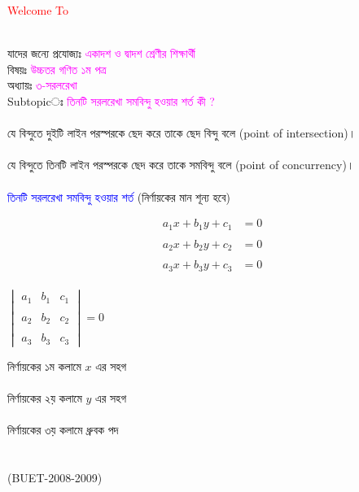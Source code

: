 \documentclass{article}
\begin{document}
 
	\Large
	\textcolor{red}{Welcome To} 
	\\
	\\
	যাদের জন্যে প্রযোজ্যঃ  	\textcolor{magenta}{একাদশ ও দ্বাদশ শ্রেণীর শিক্ষার্থী} \\
	বিষয়ঃ \textcolor{magenta}{উচ্চতর গণিত ১ম পত্র} \\
	অধ্যায়ঃ \textcolor{magenta}{৩-সরলরেখা}\\ 
	Subtopicঃ  \textcolor{magenta}{ তিনটি সরলরেখা সমবিন্দু হওয়ার শর্ত  কী ?  }\\
	\\
	যে বিন্দুতে দুইটি লাইন পরস্পরকে ছেদ করে তাকে ছেদ বিন্দু বলে (point of intersection)।  \\ 
	\\
	যে বিন্দুতে তিনটি লাইন পরস্পরকে ছেদ করে তাকে সমবিন্দু বলে (point of concurrency)। \\
	\\
	\textcolor{blue}{ তিনটি সরলরেখা সমবিন্দু হওয়ার শর্ত }(নির্ণায়কের মান শূন্য হবে)\\
\begin{multicols}{2}
\begin{align*}
	a_1x+b_1y+c_1&=0\\
	\\
	a_2x+b_2y+c_2&=0\\
	\\
	a_3x+b_3y+c_3&=0
\end{align*}
\\ 
$	\begin{vmatrix}
	a_1 & b_1 &c_1\\
	\\
	a_2 & b_2 &c_2\\
	\\
	a_3 & b_3 &c_3
\end{vmatrix}=0$\\ 
\end{multicols}
নির্ণায়কের ১ম কলামে $x$ এর সহগ \\
\\
নির্ণায়কের ২য় কলামে $y$ এর সহগ \\
\\
নির্ণায়কের ৩য় কলামে ধ্রুবক পদ \\
\\
\vspace{3cm}
\\
(BUET-2008-2009)\\
\end{document}
